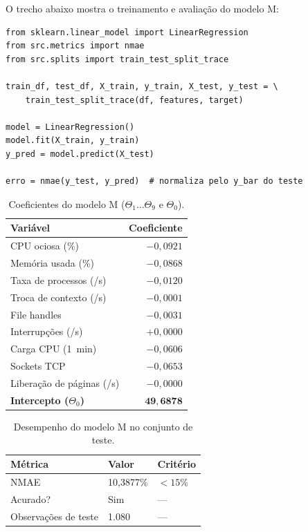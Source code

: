 \documentclass[12pt,a4paper]{article}
\begin{document}
O trecho abaixo mostra o treinamento e avaliação do modelo M:

\begin{lstlisting}[caption={Treinamento e avaliação do modelo de regressão linear (Task~II).}]
from sklearn.linear_model import LinearRegression
from src.metrics import nmae
from src.splits import train_test_split_trace

train_df, test_df, X_train, y_train, X_test, y_test = \
    train_test_split_trace(df, features, target)

model = LinearRegression()
model.fit(X_train, y_train)
y_pred = model.predict(X_test)

erro = nmae(y_test, y_pred)  # normaliza pelo y_bar do teste
\end{lstlisting}

\begin{table}[H]
\centering
\caption{Coeficientes do modelo M ($\Theta_1 \ldots \Theta_9$ e $\Theta_0$).}
\label{tab:coef_m}
\renewcommand{\arraystretch}{1.2}
\begin{tabular}{lr}
\toprule
\textbf{Variável} & \textbf{Coeficiente} \\
\midrule
CPU ociosa (\%)                   & $-0{,}0921$ \\
Memória usada (\%)                & $-0{,}0868$ \\
Taxa de processos (/s)            & $-0{,}0120$ \\
Troca de contexto (/s)            & $-0{,}0001$ \\
File handles                      & $-0{,}0031$ \\
Interrupções (/s)                 & $+0{,}0000$ \\
Carga CPU (1~min)                 & $-0{,}0606$ \\
Sockets TCP                       & $-0{,}0653$ \\
Liberação de páginas (/s)         & $-0{,}0000$ \\
\textbf{Intercepto ($\Theta_0$)}  & $\mathbf{49{,}6878}$ \\
\bottomrule
\end{tabular}
\end{table}

\begin{table}[H]
\centering
\caption{Desempenho do modelo M no conjunto de teste.}
\label{tab:desemp_m}
\renewcommand{\arraystretch}{1.2}
\begin{tabular}{lll}
\toprule
\textbf{Métrica} & \textbf{Valor} & \textbf{Critério} \\
\midrule
NMAE               & 10{,}3877\% & $< 15\%$ \\
Acurado?           & Sim         & ---      \\
Observações de teste & 1.080     & ---      \\
\bottomrule
\end{tabular}
\end{table}
\end{document}
